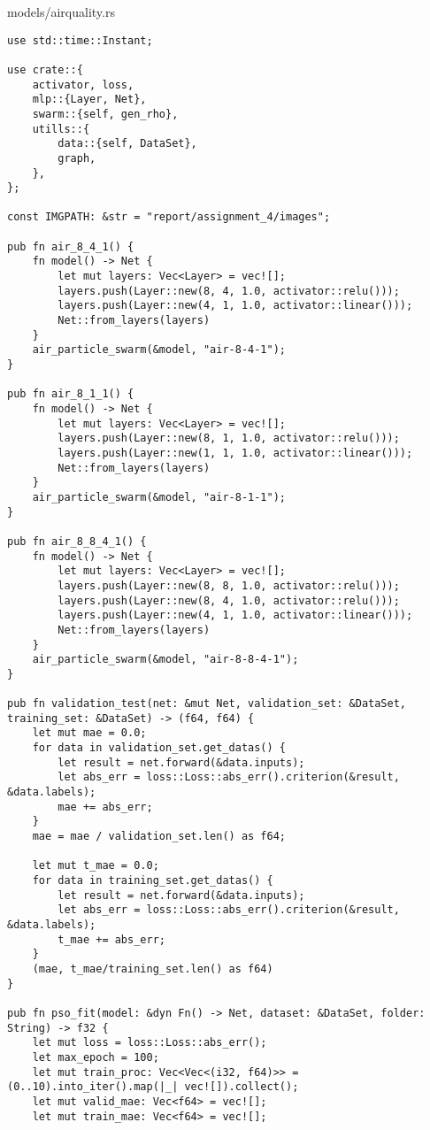 \begin{code}
\caption{models/airquality.rs}
\label{src:air}
\begin{verbatim}  
use std::time::Instant;

use crate::{
    activator, loss,
    mlp::{Layer, Net},
    swarm::{self, gen_rho},
    utills::{
        data::{self, DataSet},
        graph,
    },
};

const IMGPATH: &str = "report/assignment_4/images";

pub fn air_8_4_1() {
    fn model() -> Net {
        let mut layers: Vec<Layer> = vec![];
        layers.push(Layer::new(8, 4, 1.0, activator::relu()));
        layers.push(Layer::new(4, 1, 1.0, activator::linear()));
        Net::from_layers(layers)
    }
    air_particle_swarm(&model, "air-8-4-1");
}

pub fn air_8_1_1() {
    fn model() -> Net {
        let mut layers: Vec<Layer> = vec![];
        layers.push(Layer::new(8, 1, 1.0, activator::relu()));
        layers.push(Layer::new(1, 1, 1.0, activator::linear()));
        Net::from_layers(layers)
    }
    air_particle_swarm(&model, "air-8-1-1");
}

pub fn air_8_8_4_1() {
    fn model() -> Net {
        let mut layers: Vec<Layer> = vec![];
        layers.push(Layer::new(8, 8, 1.0, activator::relu()));
        layers.push(Layer::new(8, 4, 1.0, activator::relu()));
        layers.push(Layer::new(4, 1, 1.0, activator::linear()));
        Net::from_layers(layers)
    }
    air_particle_swarm(&model, "air-8-8-4-1");
}

pub fn validation_test(net: &mut Net, validation_set: &DataSet, training_set: &DataSet) -> (f64, f64) {
    let mut mae = 0.0;
    for data in validation_set.get_datas() {
        let result = net.forward(&data.inputs);
        let abs_err = loss::Loss::abs_err().criterion(&result, &data.labels);
        mae += abs_err;
    }
    mae = mae / validation_set.len() as f64;

    let mut t_mae = 0.0;
    for data in training_set.get_datas() {
        let result = net.forward(&data.inputs);
        let abs_err = loss::Loss::abs_err().criterion(&result, &data.labels);
        t_mae += abs_err;
    }
    (mae, t_mae/training_set.len() as f64)
}

pub fn pso_fit(model: &dyn Fn() -> Net, dataset: &DataSet, folder: String) -> f32 {
    let mut loss = loss::Loss::abs_err();
    let max_epoch = 100;
    let mut train_proc: Vec<Vec<(i32, f64)>> = (0..10).into_iter().map(|_| vec![]).collect();
    let mut valid_mae: Vec<f64> = vec![];
    let mut train_mae: Vec<f64> = vec![];


\end{verbatim}
\end{code}
